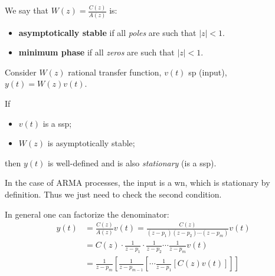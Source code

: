 \begin{definition}
	We say that $W(z)=\frac{C(z)}{A(z)}$ is:
	\begin{itemize}
		\item \textbf{asymptotically stable} if all \emph{poles} are such that $|z|<1$.
		\item \textbf{minimum phase} if all \emph{zeros} are such that $|z|<1$.
	\end{itemize}
\end{definition}

Consider $W(z)$ rational transfer function, $v(t)$ \gls{sp} (input), $y(t)=W(z)v(t)$.

\begin{theorem}
	If
	\begin{itemize}
		\item $v(t)$ is a \gls{ssp};
		\item $W(z)$ is asymptotically stable;
	\end{itemize}
	then $y(t)$ is well-defined and is also \emph{stationary} (is a \gls{ssp}).
\end{theorem}

In the case of ARMA processes, the input is a \gls{wn}, which is stationary by definition. Thus we just need to check the second condition.

In general one can factorize the denominator:
\begin{align*}
	y(t)&=\frac{C(z)}{A(z)}v(t)=\frac{C(z)}{(z-p_{1})(z-p_{2})\cdots(z-p_{m})}v(t)\\
	&=C(z)\cdot\frac{1}{z-p_{1}}\cdot\frac{1}{z-p_{2}}\cdots\frac{1}{z-p_{m}}v(t)\\
	&=\frac{1}{z-p_{m}}\left[ \frac{1}{z-p_{m-1}}\left[ \cdots\frac{1}{z-p_{1}}\left[ C(z)v(t) \right]   \right]   \right]  
\end{align*}
